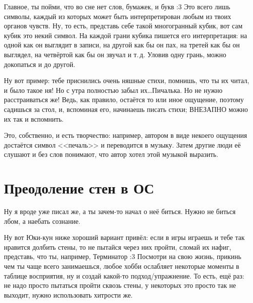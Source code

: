 \documentclass[a5paper,12pt,twoside]{memoir}
\begin{document}
Главное, ты пойми, что во сне нет слов, бумажек, и букв :3 Это всего лишь символы, каждый из которых может быть интерпретирован любым из твоих органов чувств. Ну, то есть, представь себе такой многогранный кубик, вот сам кубик это некий символ. На каждой грани кубика пишется его интерпретация: на одной как он выглядит в записи, на другой как бы он пах, на третей как бы он выглядел, на четвёртой как бы он звучал и т.\,д. Уловив одну грань, можно докопаться и до другой.
 
Ну вот пример: тебе приснились очень няшные стихи, помнишь, что ты их читал, и было такое ня! Но с утра полностью забыл их\ldots Пичалька. Но не нужно расстраиваться же! Ведь, как правило, остаётся то или иное ощущение, поэтому садишься за стол, и, вспоминая его, начинаешь писать стихи; ВНЕЗАПНО можно их так и вспомнить. 

Это, собственно, и есть творчество: например, автором в виде некоего ощущения достаётся символ <<печаль>> и переводится в музыку. Затем другие люди её слушают и без слов понимают, что автор хотел этой музыкой выразить.



\chapter{Преодоление стен в ОС}


\medskip
Ну я вроде уже писал же, а ты зачем-то начал о неё биться. Нужно не биться лбом, а наебать сознание.
 
Ну вот Юки-кун ниже хороший вариант привёл: если в игры играешь и тебе так нравится долбить стены, то не пытайся через них пройти, сломай их нафиг, представь, что ты, например, Терминатор :3 Посмотри на свою жизнь, прикинь чем ты чаще всего занимаешься, любое хобби ослабляет некоторые моменты в таблице восприятия, ну и создай какой-то подход/упражнение. То есть, ещё раз: не надо просто пытаться пройти сквозь стены, у некоторых это просто так не выходит, нужно использовать хитрости же.
\end{document}
